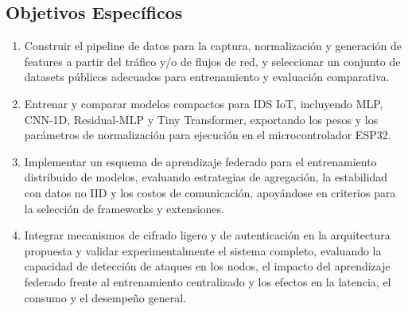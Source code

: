 \subsection{Objetivos Específicos}
\begin{enumerate}

    \item Construir el pipeline de datos para la captura, normalización y generación de features a partir del tráfico y/o de flujos de red, y seleccionar un conjunto de datasets públicos adecuados para entrenamiento y evaluación comparativa.

    \item Entrenar y comparar modelos compactos para IDS IoT, incluyendo MLP, CNN-1D, Residual-MLP y Tiny Transformer, exportando los pesos y los parámetros de normalización para ejecución en el microcontrolador ESP32.


    \item Implementar un esquema de aprendizaje federado para el entrenamiento distribuido de modelos, evaluando estrategias de agregación, la estabilidad con datos no IID y los costos de comunicación, apoyándose en criterios para la selección de frameworks y extensiones.

    \item Integrar mecanismos de cifrado ligero y de autenticación en la arquitectura propuesta y validar experimentalmente el sistema completo, evaluando la capacidad de detección de ataques en los nodos, el impacto del aprendizaje federado frente al entrenamiento centralizado y los efectos en la latencia, el consumo y el desempeño general.


\end{enumerate}

